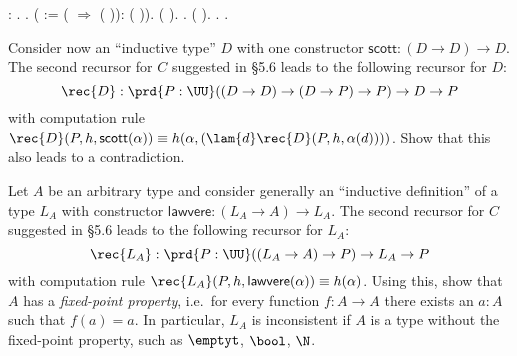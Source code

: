\begin{coqdoccode}
\coqdocemptyline
\coqdocnoindent
{}  : .\coqdoceol
\coqdocnoindent
{}.\coqdoceol
\coqdocindent{1.00em}
 ( := (   \ensuremath{\Rightarrow}  ( )): (        )).\coqdoceol
\coqdocindent{1.00em}
 (  ).\coqdoceol
\coqdocindent{1.00em}
 .  (  ).\coqdoceol
\coqdocnoindent
{}.\coqdoceol
\coqdocemptyline
\coqdocnoindent
{} .\coqdoceol
\coqdocemptyline
\end{coqdoccode}
Consider now an ``inductive type'' $D$ with one constructor $\mathsf{scott} :
(D \to D) \to D$.  The second recursor for $C$ suggested in \S5.6 leads to
the following recursor for $D$:
\[
  \rec{D} : \prd{P:\UU} ((D \to D) \to (D \to P) \to P) \to D \to P
\]
with computation rule $\rec{D}(P, h, \mathsf{scott}(\alpha)) \equiv h(\alpha,
(\lam{d}\rec{D}(P, h, \alpha(d))))$. Show that this also leads to a
contradiction.


Let $A$ be an arbitrary type and consider generally an ``inductive definition''
of a type $L_{A}$ with constructor $\mathsf{lawvere}:(L_{A} \to A) \to L_{A}$.
The second recursor for $C$ suggested in \S5.6 leads to the following
recursor for $L_{A}$:
\[
  \rec{L_{A}} : \prd{P:\UU} ((L_{A} \to A) \to P) \to L_{A} \to P
\]
with computation rule $\rec{L_{A}}(P, h, \mathsf{lawvere}(\alpha)) \equiv
h(\alpha)$.  Using this, show that $A$ has a \textit{fixed-point property}, i.e.~for
every function $f : A \to A$ there exists an $a : A$ such that $f(a) = a$.  In
particular, $L_{A}$ is inconsistent if $A$ is a type without the fixed-point
property, such as $\emptyt$, $\bool$, $\N$.


